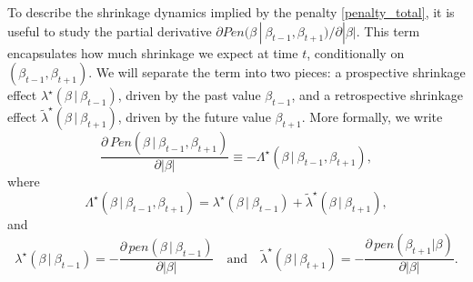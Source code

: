 \documentclass[ba]{imsart}
\numberwithin{equation}{section}
\theoremstyle{plain}
\def\C {\,|\:}
\def\C {\,|\:}
\begin{document}
To describe  the shrinkage dynamics implied by the  penalty \eqref{penalty_total}, it is useful to study the partial derivative $\partial Pen(\beta\C\beta_{t-1},\beta_{t+1})/\partial|\beta|$. This  term encapsulates how much shrinkage we expect at time  $t$, conditionally on $(\beta_{t-1},\beta_{t+1})$.
We will separate the term into two pieces: a prospective shrinkage effect $\lambda^\star(\beta\C\beta_{t-1})$, driven by the past value $\beta_{t-1}$, and a retrospective shrinkage effect $\widetilde{\lambda}^\star(\beta\C\beta_{t+1})$, driven by the future value $\beta_{t+1}$. More formally, we write
$$
\frac{\partial\, Pen(\beta\C\beta_{t-1},\beta_{t+1})}{\partial|\beta|}\equiv -\Lambda^\star(\beta\C\beta_{t-1},\beta_{t+1}),
$$
where
\begin{equation}\label{big_lambda}
\Lambda^\star(\beta\C\beta_{t-1},\beta_{t+1})=\lambda^\star(\beta\C\beta_{t-1})+\widetilde{\lambda}^\star(\beta\C\beta_{t+1}),
\end{equation}
and
$$
\lambda^\star(\beta\C\beta_{t-1})=-\frac{\partial\, pen(\beta\C\beta_{t-1})}{\partial|\beta|}\quad\text{and}\quad \widetilde{\lambda}^\star(\beta\C\beta_{t+1})=-\frac{\partial\, pen(\beta_{t+1}|\beta)}{\partial|\beta|}.
$$
\end{document}
